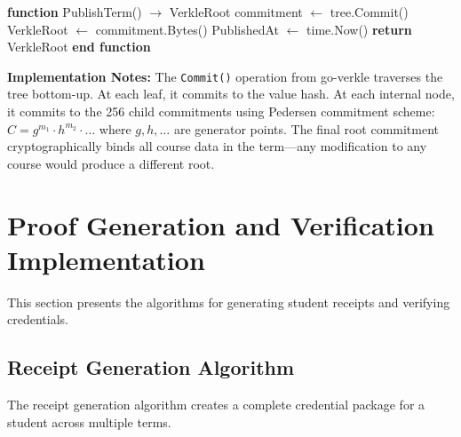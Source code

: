\begin{algorithm}[H]
\caption{PublishTerm - Compute Tree Commitment}
\label{alg:publish-term}
\begin{algorithmic}[1]
\STATE \textbf{function} PublishTerm() $\rightarrow$ VerkleRoot
\STATE \quad commitment $\leftarrow$ tree.Commit()
\STATE \quad {}
\STATE
\STATE \quad VerkleRoot $\leftarrow$ commitment.Bytes()
\STATE \quad {}
\STATE
\STATE \quad PublishedAt $\leftarrow$ time.Now()
\STATE \quad {}
\STATE
\STATE \quad \textbf{return} VerkleRoot
\STATE \textbf{end function}
\end{algorithmic}
\end{algorithm}

\textbf{Implementation Notes:} The \texttt{Commit()} operation from go-verkle traverses the tree bottom-up. At each leaf, it commits to the value hash. At each internal node, it commits to the 256 child commitments using Pedersen commitment scheme: $C = g^{m_1} \cdot h^{m_2} \cdot \ldots$ where $g, h, \ldots$ are generator points. The final root commitment cryptographically binds all course data in the term—any modification to any course would produce a different root.

\section{Proof Generation and Verification Implementation}
\label{sec:proof-impl}

This section presents the algorithms for generating student receipts and verifying credentials.

\subsection{Receipt Generation Algorithm}
\label{subsec:receipt-generation-algo}

The receipt generation algorithm creates a complete credential package for a student across multiple terms.

